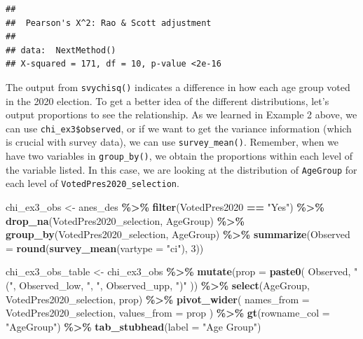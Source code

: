 \documentclass[
]{krantz}
\makeatletter
\newenvironment{Shaded}{\begin{snugshade}}{\end{snugshade}}
\newcommand{\AttributeTok}[1]{\textcolor[rgb]{0.27,0.27,0.27}{#1}}
\newcommand{\DecValTok}[1]{\textcolor[rgb]{0.06,0.06,0.06}{#1}}
\newcommand{\FunctionTok}[1]{\textcolor[rgb]{0.27,0.27,0.27}{\textbf{#1}}}
\newcommand{\NormalTok}[1]{#1}
\newcommand{\OtherTok}[1]{\textcolor[rgb]{0.37,0.37,0.37}{#1}}
\newcommand{\SpecialCharTok}[1]{\textcolor[rgb]{0.43,0.43,0.43}{\textbf{#1}}}
\newcommand{\StringTok}[1]{\textcolor[rgb]{0.5,0.5,0.5}{#1}}
\newenvironment{kframe}{%
\medskip{}
\setlength{\fboxsep}{.8em}
 \def\at@end@of@kframe{}%
 \ifinner\ifhmode%
  \def\at@end@of@kframe{\end{minipage}}%
  \begin{minipage}{\columnwidth}%
 \fi\fi%
 \def\FrameCommand##1{\hskip\@totalleftmargin \hskip-\fboxsep
 \colorbox{shadecolor}{##1}\hskip-\fboxsep
     \hskip-\linewidth \hskip-\@totalleftmargin \hskip\columnwidth}%
 \MakeFramed {\advance\hsize-\width
   \@totalleftmargin\z@ \linewidth\hsize
   \@setminipage}}%
 {\par\unskip\endMakeFramed%
 \at@end@of@kframe}
\renewenvironment{Shaded}{\begin{kframe}}{\end{kframe}}
\makeatother
\begin{document}
\begin{verbatim}
## 
##  Pearson's X^2: Rao & Scott adjustment
## 
## data:  NextMethod()
## X-squared = 171, df = 10, p-value <2e-16
\end{verbatim}

The output from \texttt{svychisq()} indicates a difference in how each age group voted in the 2020 election. To get a better idea of the different distributions, let's output proportions to see the relationship. As we learned in Example 2 above, we can use \texttt{chi\_ex3\$observed}, or if we want to get the variance information (which is crucial with survey data), we can use \texttt{survey\_mean()}. Remember, when we have two variables in \texttt{group\_by()}, we obtain the proportions within each level of the variable listed. In this case, we are looking at the distribution of \texttt{AgeGroup} for each level of \texttt{VotedPres2020\_selection}.

\begin{Shaded}
\begin{Highlighting}[]
\NormalTok{chi\_ex3\_obs }\OtherTok{\textless{}{-}}\NormalTok{ anes\_des }\SpecialCharTok{\%\textgreater{}\%}
  \FunctionTok{filter}\NormalTok{(VotedPres2020 }\SpecialCharTok{==} \StringTok{"Yes"}\NormalTok{) }\SpecialCharTok{\%\textgreater{}\%}
  \FunctionTok{drop\_na}\NormalTok{(VotedPres2020\_selection, AgeGroup) }\SpecialCharTok{\%\textgreater{}\%}
  \FunctionTok{group\_by}\NormalTok{(VotedPres2020\_selection, AgeGroup) }\SpecialCharTok{\%\textgreater{}\%}
  \FunctionTok{summarize}\NormalTok{(}\AttributeTok{Observed =} \FunctionTok{round}\NormalTok{(}\FunctionTok{survey\_mean}\NormalTok{(}\AttributeTok{vartype =} \StringTok{"ci"}\NormalTok{), }\DecValTok{3}\NormalTok{))}

\NormalTok{chi\_ex3\_obs\_table }\OtherTok{\textless{}{-}}\NormalTok{ chi\_ex3\_obs }\SpecialCharTok{\%\textgreater{}\%}
  \FunctionTok{mutate}\NormalTok{(}\AttributeTok{prop =} \FunctionTok{paste0}\NormalTok{(}
\NormalTok{    Observed, }\StringTok{" ("}\NormalTok{, Observed\_low, }\StringTok{", "}\NormalTok{,}
\NormalTok{    Observed\_upp, }\StringTok{")"}
\NormalTok{  )) }\SpecialCharTok{\%\textgreater{}\%}
  \FunctionTok{select}\NormalTok{(AgeGroup, VotedPres2020\_selection, prop) }\SpecialCharTok{\%\textgreater{}\%}
  \FunctionTok{pivot\_wider}\NormalTok{(}
    \AttributeTok{names\_from =}\NormalTok{ VotedPres2020\_selection,}
    \AttributeTok{values\_from =}\NormalTok{ prop}
\NormalTok{  ) }\SpecialCharTok{\%\textgreater{}\%}
  \FunctionTok{gt}\NormalTok{(}\AttributeTok{rowname\_col =} \StringTok{"AgeGroup"}\NormalTok{) }\SpecialCharTok{\%\textgreater{}\%}
  \FunctionTok{tab\_stubhead}\NormalTok{(}\AttributeTok{label =} \StringTok{"Age Group"}\NormalTok{)}
\end{Highlighting}
\end{Shaded}
\end{document}
